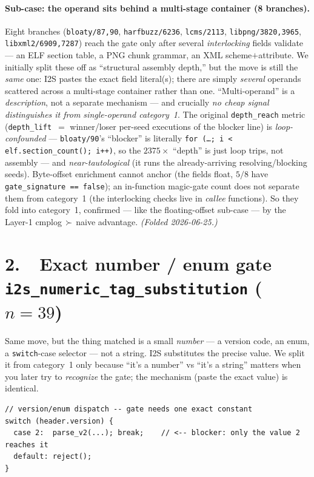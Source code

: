 \documentclass[11pt]{article}
\begin{document}
\paragraph{Sub-case: the operand sits behind a multi-stage container (8 branches).}
Eight branches (\texttt{bloaty/87,90}, \texttt{harfbuzz/6236}, \texttt{lcms/2113},
\texttt{libpng/3820,3965}, \texttt{libxml2/6909,7287}) reach the gate only after
several \emph{interlocking} fields validate --- an ELF section table, a PNG chunk
grammar, an XML scheme$+$attribute. We initially split these off as ``structural
assembly depth,'' but the move is still the \emph{same} one: I2S pastes the exact
field literal(s); there are simply \emph{several} operands scattered across a
multi-stage container rather than one. ``Multi-operand'' is a \emph{description},
not a separate mechanism --- and crucially \emph{no cheap signal distinguishes it
from single-operand category~1}. The original \texttt{depth\_reach} metric
(\texttt{depth\_lift}~$=$ winner/loser per-seed executions of the blocker line) is
\emph{loop-confounded} --- \texttt{bloaty/90}'s ``blocker'' is literally
\texttt{for (\ldots; i < elf.section\_count(); i++)}, so the $2375\times$ ``depth''
is just loop trips, not assembly --- and \emph{near-tautological} (it runs the
already-arriving resolving/blocking seeds). Byte-offset enrichment cannot anchor
(the fields float, $5/8$ have \texttt{gate\_signature == false}); an in-function
magic-gate count does not separate them from category~1 (the interlocking checks
live in \emph{callee} functions). So they fold into category~1, confirmed --- like
the floating-offset sub-case --- by the Layer-1 \mbox{cmplog\,$\succ$\,naive}
advantage. \emph{(Folded 2026-06-25.)}

\section*{2.\ \ Exact number / enum gate \hfill {\normalsize\texttt{i2s\_numeric\_tag\_substitution} ($n=39$)}}
Same move, but the thing matched is a small \emph{number} --- a version code, an
enum, a \texttt{switch}-case selector --- not a string. I2S substitutes the
precise value. We split it from category~1 only because ``it's a number'' vs
``it's a string'' matters when you later try to \emph{recognize} the gate; the
mechanism (paste the exact value) is identical.

\begin{lstlisting}[style=c]
// version/enum dispatch -- gate needs one exact constant
switch (header.version) {
  case 2:  parse_v2(...); break;    // <-- blocker: only the value 2 reaches it
  default: reject();
}
\end{lstlisting}
\end{document}

